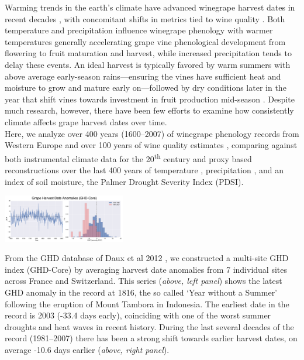 \documentclass[portrait,a0,final] {a0poster} %
\begin{document}
\begin{multicols}{2}
Warming trends in the earth's climate have advanced winegrape harvest dates in recent decades \cite{Duchene:2005bd,Seguin2005,schultzjones,webb2012}, with concomitant shifts in metrics tied to wine quality \cite{jones2005}. Both temperature and precipitation influence winegrape phenology with warmer temperatures generally accelerating grape vine  phenological development from flowering to fruit maturation and harvest, while increased precipitation tends to delay these events. An ideal harvest is typically favored by warm summers with above average early-season rains---ensuring the vines have sufficient heat and moisture to grow and mature early on---followed by dry conditions later in the year that shift vines towards investment in fruit production mid-season \cite{baciocco2014}. Despite much research, however, there have been few efforts to examine how consistently climate affects grape harvest dates over time.\\

Here, we analyze over 400 years (1600--2007) of winegrape phenology records from Western Europe \cite{daux2012} and over 100 years of wine quality estimates \cite{Broadbent2002}, comparing against both instrumental climate data for the 20\textsuperscript{th} century \cite{Harris2014} and proxy based reconstructions over the last 400 years of temperature \cite{Luterbacher2004}, precipitation \cite{Pauling2006}, and an index of soil moisture, the Palmer Drought Severity Index \cite{CookOWDA2015} (PDSI).\\

\begin{center}
\includegraphics[width=0.4\textwidth]{../MANUSCRIPT/fig_01_time_ghd_core.png}
\end{center}
From the GHD database of Daux et al 2012 \cite{daux2012}, we constructed a multi-site GHD index (GHD-Core) by averaging harvest date anomalies from 7 individual sites across France and Switzerland. This series (\emph{above, left panel}) shows the latest GHD anomaly in the record at 1816, the so called `Year without a Summer' following the eruption of Mount Tambora in Indonesia. The earliest date in the record is 2003 (-33.4 days early), coinciding with one of the worst summer droughts and heat waves in recent history. During the last several decades of the record (1981--2007) there has been a strong shift towards earlier harvest dates, on average -10.6 days earlier (\emph{above, right panel}). 

\end{multicols}
\end{document}
